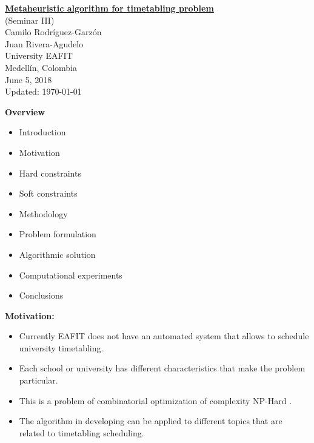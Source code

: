 \documentclass[centering]{report}
\newenvironment{slide}
    {\newpage
    \vspace*{\fill}
    }
    { 
     \vspace*{\fill}
    }
\begin{document}
\Huge %

\setcounter{chapter}{1}
\setcounter{section}{1}

\newpage
\thispagestyle{empty}
\vspace*{\fill}
\begin{center}
  {\Huge{\underline{\textbf{Metaheuristic algorithm for timetabling problem}}}} \\[4mm]
  {\Huge{(Seminar III)}} \\[10mm]
  {\Huge{Camilo Rodríguez-Garzón}} \\
  {\Huge{Juan Rivera-Agudelo}} \\[10mm]
  {\Huge University EAFIT}\\
  {\Huge Medellín, Colombia}\\[20mm]
  {\Huge June 5, 2018}\\
  {\LARGE\color{gray} Updated: \today}
\end{center}
\vspace*{\fill}

\begin{slide}
\textbf{Overview}\\
\begin{itemize}
    \item Introduction
    \item Motivation
    \item Hard constraints
    \item Soft constraints
    \item Methodology
    \item Problem formulation
    \item Algorithmic solution
    \item Computational experiments
    \item Conclusions
\end{itemize}
\end{slide}

\begin{slide}
\textbf{Motivation:}\\

\begin{itemize}
\item Currently EAFIT does not have an automated system that allows to schedule university timetabling.
\item Each school or university has different characteristics that make the problem particular.
\item This is a problem of combinatorial optimization of complexity NP-Hard \cite {Abdelhalim2016}.
\item The algorithm in developing can be applied to different topics that are related to timetabling scheduling.
\end{itemize}

\end{slide}
\end{document}
